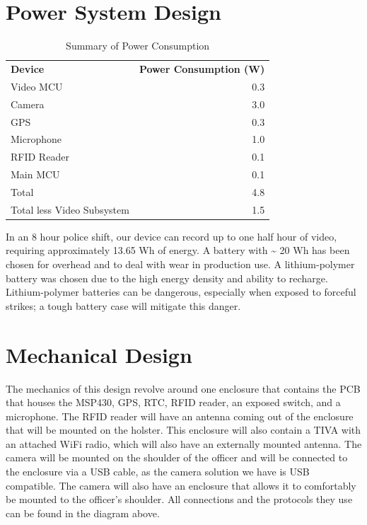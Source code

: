 \documentclass[12pt]{article}
\begin{document}
\section{Power System Design}

\begin{table}[h!]
    \centering
    \caption{Summary of Power Consumption}
    \begin{tabular}{lr}
        \textbf{Device} & \textbf{Power Consumption (W)}\\
        Video MCU & 0.3\\
        Camera & 3.0\\
        GPS & 0.3\\
        Microphone & 1.0\\
        RFID Reader & 0.1\\
        Main MCU & 0.1\\
        Total & 4.8\\
        Total less Video Subsystem & 1.5\\
    \end{tabular}
\end{table}

In an 8 hour police shift, our device can record up to one half hour of video,
requiring approximately 13.65 Wh of energy. A battery with \textasciitilde{} 20
Wh has been chosen for overhead and to deal with wear in production use. A
lithium-polymer battery was chosen due to the high energy density and ability
to recharge. Lithium-polymer batteries can be dangerous, especially when
exposed to forceful strikes; a tough battery case will mitigate this danger.

\section{Mechanical Design}

The mechanics of this design revolve around one enclosure that contains the PCB
that houses the MSP430, GPS, RTC, RFID reader, an exposed switch, and a
microphone. The RFID reader will have an antenna coming out of the enclosure
that will be mounted on the holster. This enclosure will also contain a TIVA
with an attached WiFi radio, which will also have an externally mounted
antenna. The camera will be mounted on the shoulder of the officer and will be
connected to the enclosure via a USB cable, as the camera solution we have is
USB compatible. The camera will also have an enclosure that allows it to
comfortably be mounted to the officer's shoulder. All connections and the
protocols they use can be found in the diagram above.
\end{document}
